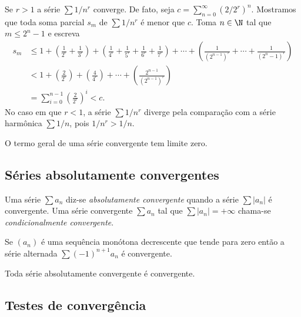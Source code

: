 \documentclass{article}
\begin{document}
\begin{exmp} [p-série]
    Se \(r>1\) a série \(\sum 1/n^r\) converge. De fato, seja \(c = \sum_{n=0}^{\infty} (2/2^r)^n\). Mostramos que toda soma parcial \(s_m\) de \(\sum 1/n^r\) é menor que \(c\). Toma \(n \in \N\) tal que \(m \leq 2^n-1\) e escreva
    \begin{align*}
        s_m &\leq 1 + \left(\frac{1}{2^r} + \frac{1}{3^r}\right) + \left(\frac{1}{4^r}+\frac{1}{5^r}+\frac{1}{6^r}+\frac{1}{7^r}\right) + \cdots + \left(\frac{1}{(2^{n-1})^r} + \cdots + \frac{1}{(2^n-1)^r}\right)\\
        &< 1 + \left(\frac{2}{2^r}\right) + \left(\frac{4}{4^r}\right) + \cdots + \left(\frac{2^{n-1}}{(2^{n-1})^r}\right) \\
        &= \sum_{i=0}^{n-1} \left(\frac{2}{2^r}\right)^i < c.
    \end{align*}
    No caso em que \(r<1\), a série \(\sum 1/n^r\) diverge pela comparação com a série harmônica \(\sum 1/n\), pois \(1/n^r > 1/n\).
\end{exmp}

\begin{prop}
    O termo geral de uma série convergente tem limite zero.
\end{prop}

\subsection{Séries absolutamente convergentes}

\begin{defn}
    Uma série \(\sum a_n\) diz-se \emph{absolutamente convergente} quando a série \(\sum |a_n|\) é convergente.
    Uma série convergente \(\sum a_n\) tal que \(\sum |a_n| = +\infty\) chama-se \emph{condicionalmente convergente}.
\end{defn}

\begin{thm} [Leibniz]
    Se \((a_n)\) é uma sequência monótona decrescente que tende para zero então a série alternada \(\sum (-1)^{n+1} a_n\) é convergente.
\end{thm}

\begin{prop}
    Toda série absolutamente convergente é convergente.
\end{prop}

\subsection{Testes de convergência}
\end{document}

